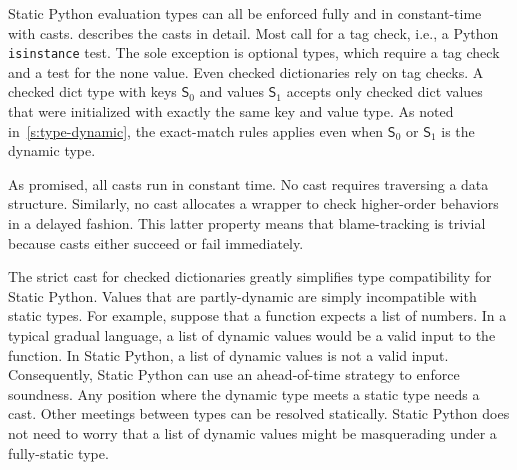 \documentclass[english,cleveref,submission]{programming}
\newcommand{\SP}{Static Python}
\newcommand{\code}[1]{\texttt{#1}}
\newcommand{\typefont}[1]{\mathsf{#1}}
\newcommand{\spteval}{\typefont{S}}
\begin{document}
\SP{} evaluation types can all be enforced fully and in constant-time
with casts.
 describes the casts in detail.
Most call for a tag check, i.e., a Python \code{isinstance} test.
The sole exception is optional types, which require a tag check and a test for the none value.
Even checked dictionaries rely on tag checks.
A checked dict type with keys $\spteval_0$ and values $\spteval_1$ accepts only
checked dict values that were initialized with exactly the same key and value type.
As noted in~\cref{s:type-dynamic}, the exact-match rules applies even when $\spteval_0$
or $\spteval_1$ is the dynamic type.

As promised, all casts run in constant time.
No cast requires traversing a data structure.
Similarly, no cast allocates a wrapper to check higher-order behaviors in a delayed fashion.
This latter property means that blame-tracking is trivial because
casts either succeed or fail immediately.

The strict cast for checked dictionaries greatly simplifies type compatibility for \SP{}.
Values that are partly-dynamic are simply incompatible with static types.
For example, suppose that a function expects a list of numbers.
In a typical gradual language, a list of dynamic values would be a valid input to the function.
In \SP{}, a list of dynamic values is not a valid input.
Consequently, \SP{} can use an ahead-of-time strategy to enforce soundness.
Any position where the dynamic type meets a static type needs a cast.
Other meetings between types can be resolved statically.
\SP{} does not need to worry that a list of dynamic values might be masquerading
under a fully-static type.
\end{document}
